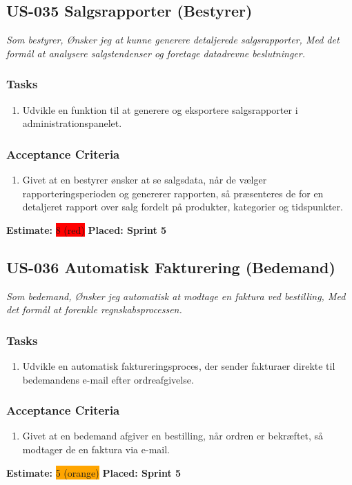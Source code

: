 \subsection{US-035 Salgsrapporter (Bestyrer)}
\label{sec:US-035}
\textit{Som bestyrer, Ønsker jeg at kunne generere detaljerede salgsrapporter, Med det formål at analysere salgstendenser og foretage datadrevne beslutninger.}
\subsubsection*{\textbf{Tasks}}
\begin{enumerate}
  \item Udvikle en funktion til at generere og eksportere salgsrapporter i administrationspanelet.
\end{enumerate}
\subsubsection*{\textbf{Acceptance Criteria}}
\begin{enumerate}
  \item Givet at en bestyrer ønsker at se salgsdata, når de vælger rapporteringsperioden og genererer rapporten, så præsenteres de for en detaljeret rapport over salg fordelt på produkter, kategorier og tidspunkter.
\end{enumerate}
\textbf{Estimate:} \colorbox{red}{8 (red)}
\textbf{Placed: Sprint 5}
\par\noindent\dotfill

\subsection{US-036 Automatisk Fakturering (Bedemand)}
\label{sec:US-036}
\textit{Som bedemand, Ønsker jeg automatisk at modtage en faktura ved bestilling, Med det formål at forenkle regnskabsprocessen.}
\subsubsection*{\textbf{Tasks}}
\begin{enumerate}
  \item Udvikle en automatisk faktureringsproces, der sender fakturaer direkte til bedemandens e-mail efter ordreafgivelse.
\end{enumerate}
\subsubsection*{\textbf{Acceptance Criteria}}
\begin{enumerate}
  \item Givet at en bedemand afgiver en bestilling, når ordren er bekræftet, så modtager de en faktura via e-mail.
\end{enumerate}
\textbf{Estimate:} \colorbox{orange}{5 (orange)}
\textbf{Placed: Sprint 5}
\par\noindent\dotfill


